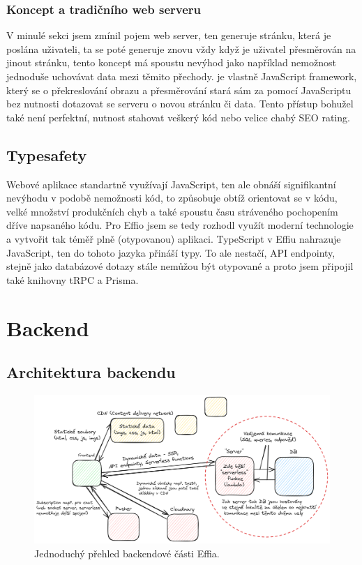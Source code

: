 \documentclass[12pt, a4paper,
openright
]{report}
\begin{document}
\subsection{Koncept  a tradičního web serveru }
V minulé sekci jsem zmínil pojem web server, ten generuje stránku, která je poslána uživateli, ta se poté generuje znovu vždy když je uživatel přesměrován na jinout stránku, tento koncept má spoustu nevýhod jako například nemožnost jednoduše uchovávat data mezi těmito přechody. je vlastně JavaScript framework, který se o překreslování obrazu a přesměrování stará sám za pomocí JavaScriptu bez nutnosti dotazovat se serveru o novou stránku či data. Tento přístup bohužel také není perfektní, nutnost stahovat veškerý kód nebo velice chabý SEO rating.

\section{Typesafety}

Webové aplikace standartně využívají JavaScript, ten ale obnáší signifikantní nevýhodu v podobě nemožnosti  kód, to způsobuje obtíž orientovat se v kódu, velké množství produkčních chyb a také spoustu času stráveného pochopením dříve napsaného kódu. Pro Effio jsem se tedy rozhodl využít moderní technologie a vytvořit tak téměř plně  (otypovanou) aplikaci. TypeScript v Effiu nahrazuje JavaScript, ten do tohoto jazyka přináší typy. To ale nestačí, API endpointy, stejně jako databázové dotazy stále nemůžou být otypované a proto jsem připojil také knihovny tRPC a Prisma.


\chapter{Backend}

\section{Architektura backendu}
\begin{figure}[h!]
	\centering %
	\includegraphics[width=1\linewidth]{image/effio-architecture-simple.png} 
	\caption{Jednoduchý přehled backendové části Effia.} %
	\label{fig:effio-architecture} %
\end{figure}
\end{document}
